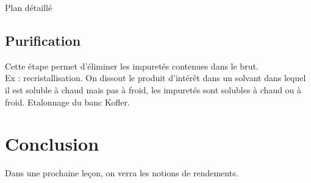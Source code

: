 \begin{reportBlock}{Plan détaillé}
\subsection{Purification}
Cette étape permet d'éliminer les impuretés contenues dans le brut.\\

Ex : recristallisation. On dissout le produit d'intérêt dans un solvant dans lequel il est soluble à chaud mais pas à froid, les impuretés sont solubles à chaud ou à froid. Etalonnage du banc Kofler.\\

\section*{Conclusion}
Dans une prochaine leçon, on verra les notions de rendements.
\end{reportBlock}